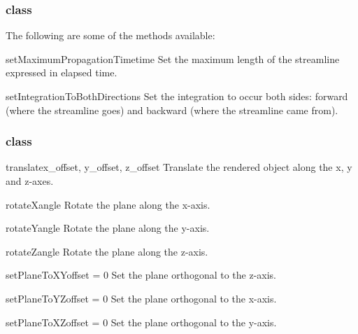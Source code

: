 \subsubsection{\StreamLineModule class}

The following are some of the methods available:

\begin{methoddesc}[StreamLineModule]{setMaximumPropagationTime}{time}
Set the maximum length of the streamline expressed in elapsed time.
\end{methoddesc}

\begin{methoddesc}[StreamLineModule]{setIntegrationToBothDirections}{}
Set the integration to occur both sides: forward (where the streamline
goes) and backward (where the streamline came from).
\end{methoddesc}

\subsubsection{\Transform class}

\begin{methoddesc}[Transform]{translate}{x_offset, y_offset, z_offset}
Translate the rendered object along the x, y and z-axes.
\end{methoddesc}

\begin{methoddesc}[Transform]{rotateX}{angle}
Rotate the plane along the x-axis.
\end{methoddesc}

\begin{methoddesc}[Transform]{rotateY}{angle}
Rotate the plane along the y-axis.
\end{methoddesc}

\begin{methoddesc}[Transform]{rotateZ}{angle}
Rotate the plane along the z-axis.
\end{methoddesc}

\begin{methoddesc}[Transform]{setPlaneToXY}{offset = 0}
Set the plane orthogonal to the z-axis.
\end{methoddesc}

\begin{methoddesc}[Transform]{setPlaneToYZ}{offset = 0}
Set the plane orthogonal to the x-axis.
\end{methoddesc}

\begin{methoddesc}[Transform]{setPlaneToXZ}{offset = 0}
Set the plane orthogonal to the y-axis.
\end{methoddesc}

